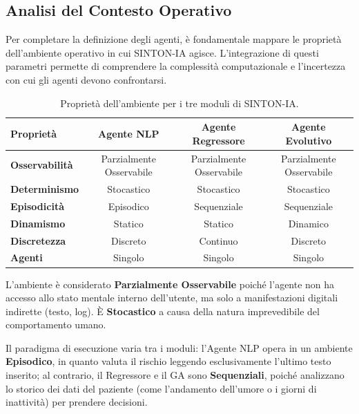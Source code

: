 \subsection{Analisi del Contesto Operativo}
\label{subsec:task_environment}

Per completare la definizione degli agenti, è fondamentale mappare le proprietà dell’ambiente operativo in cui SINTON-IA agisce. L'integrazione di questi parametri permette di comprendere la complessità computazionale e l’incertezza con cui gli agenti devono confrontarsi.

\begin{table}[H]
    \centering
    \renewcommand{\arraystretch}{1.5}
    \small
    \begin{tabular}{|l|c|c|c|}
        \hline
        \textbf{Proprietà}     & \textbf{Agente NLP}      & \textbf{Agente Regressore} & \textbf{Agente Evolutivo} \\ \hline
        \textbf{Osservabilità} & Parzialmente Osservabile & Parzialmente Osservabile   & Parzialmente Osservabile  \\ \hline
        \textbf{Determinismo}  & Stocastico               & Stocastico                 & Stocastico                \\ \hline
        \textbf{Episodicità}   & Episodico                & Sequenziale                & Sequenziale               \\ \hline
        \textbf{Dinamismo}     & Statico                  & Statico                    & Dinamico                  \\ \hline
        \textbf{Discretezza}   & Discreto                 & Continuo                   & Discreto                  \\ \hline
        \textbf{Agenti}        & Singolo                  & Singolo                    & Singolo                   \\ \hline
    \end{tabular}
    \caption{Proprietà dell'ambiente per i tre moduli di SINTON-IA.}
    \label{tab:task_environment}
\end{table}

L'ambiente è considerato \textbf{Parzialmente Osservabile} poiché l'agente non ha accesso allo stato mentale interno dell'utente, ma solo a manifestazioni digitali indirette (testo, log). È \textbf{Stocastico} a causa della natura imprevedibile del comportamento umano.

Il paradigma di esecuzione varia tra i moduli: l'Agente NLP opera in un ambiente \textbf{Episodico}, in quanto valuta il rischio leggendo esclusivamente l'ultimo testo inserito; al contrario, il Regressore e il GA sono \textbf{Sequenziali}, poiché analizzano lo storico dei dati del paziente (come l'andamento dell'umore o i giorni di inattività) per prendere decisioni.

